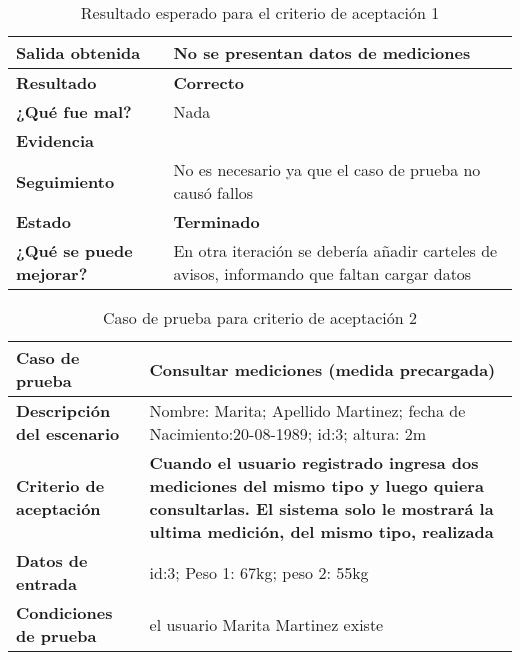         {\scriptsize
	\begin{table}[h]
	\centering
	\begin{tabular}{|l|p{10cm}|}
	    \hline 
	    \textbf{Salida obtenida}& No se presentan datos de mediciones\\ \hline
	    \textbf{Resultado}& \textbf{Correcto}\\ \hline
        \textbf{¿Qué fue mal?}& Nada\\ \hline      
        \textbf{Evidencia}& \\ \hline
        \textbf{Seguimiento}&No es necesario ya que el caso de prueba no causó
fallos \\ \hline
        \textbf{Estado}& \textbf{Terminado}\\ \hline        
         \textbf{¿Qué se puede mejorar?}& En otra iteración se debería añadir carteles de avisos, informando que faltan cargar datos \\ \hline              
	    \end{tabular}
        \caption{Resultado esperado para el criterio de aceptación 1}
    	\end{table}
	}
\clearpage 

{\scriptsize
	\begin{table}[h]
	\centering
	\begin{tabular}{|m{4cm}|m{9cm}|}
    	\rowcolor[gray]{0.9}
	    \hline
	    \textbf{Caso de prueba}  &  \textbf{Consultar mediciones (medida precargada)}\\  \hline
	    \textbf{Descripción del escenario}& Nombre: Marita; Apellido Martinez; fecha de Nacimiento:20-08-1989; id:3; altura: 2m  \\ 			\hline
	    \textbf{Criterio de aceptación} &\textbf{Cuando el usuario registrado ingresa dos mediciones del mismo tipo y luego quiera consultarlas. El sistema solo le mostrará la ultima medición, del mismo tipo, realizada} \\ \hline
        \textbf{Datos de entrada}& id:3; Peso 1: 67kg; peso 2: 55kg \\ \hline
        \textbf{Condiciones de  prueba}& el usuario Marita Martinez existe \\ \hline
	    \end{tabular}
        \caption{Caso de prueba para criterio de aceptación 2}        
	    \end{table}
}
 

